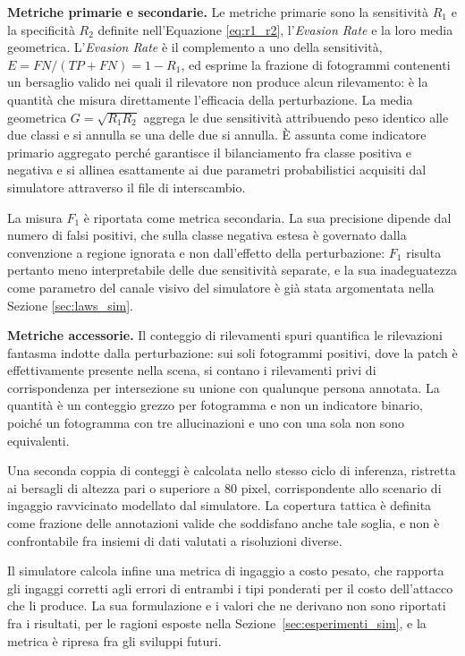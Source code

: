 \documentclass[a4paper,12pt]{report}
\begin{document}
\textbf{Metriche primarie e secondarie.}
\label{sec:metriche_scelta}
Le metriche primarie sono la sensitività $R_1$ e la specificità $R_2$ definite
nell'Equazione \ref{eq:r1_r2}, l'\textit{Evasion Rate} e la loro media
geometrica. L'\textit{Evasion Rate} è il complemento a uno della sensitività,
$E = \mathit{FN} / (\mathit{TP} + \mathit{FN}) = 1 - R_1$, ed esprime la frazione
di fotogrammi contenenti un bersaglio valido nei quali il rilevatore non produce
alcun rilevamento: è la quantità che misura direttamente l'efficacia della
perturbazione. La media geometrica $G = \sqrt{R_1 R_2}$ aggrega le due
sensitività attribuendo peso identico alle due classi e si annulla se una delle
due si annulla. È assunta come indicatore primario aggregato perché garantisce il
bilanciamento fra classe positiva e negativa e si allinea esattamente ai due
parametri probabilistici acquisiti dal simulatore attraverso il file di
interscambio.

La misura $F_1$ è riportata come metrica secondaria. La sua precisione dipende
dal numero di falsi positivi, che sulla classe negativa estesa è governato dalla
convenzione a regione ignorata e non dall'effetto della perturbazione: $F_1$
risulta pertanto meno interpretabile delle due sensitività separate, e la sua
inadeguatezza come parametro del canale visivo del simulatore è già stata
argomentata nella Sezione \ref{sec:laws_sim}.

\textbf{Metriche accessorie.}
\label{sec:metriche_accessorie}
Il conteggio di rilevamenti spuri quantifica le rilevazioni fantasma indotte dalla
perturbazione: sui soli fotogrammi positivi, dove la patch è effettivamente
presente nella scena, si contano i rilevamenti privi di corrispondenza per
intersezione su unione con qualunque persona annotata. La quantità è un
conteggio grezzo per fotogramma e non un indicatore binario, poiché un
fotogramma con tre allucinazioni e uno con una sola non sono equivalenti.

Una seconda coppia di conteggi è calcolata nello stesso ciclo di inferenza,
ristretta ai bersagli di altezza pari o superiore a $80$ pixel, corrispondente
allo scenario di ingaggio ravvicinato modellato dal simulatore. La copertura
tattica è definita come frazione delle annotazioni valide che soddisfano anche
tale soglia, e non è confrontabile fra insiemi di dati valutati a risoluzioni
diverse.

Il simulatore calcola infine una metrica di ingaggio a costo pesato, che
rapporta gli ingaggi corretti agli errori di entrambi i tipi ponderati per il
costo dell'attacco che li produce. La sua formulazione e i valori che ne
derivano non sono riportati fra i risultati, per le ragioni esposte nella
Sezione~\ref{sec:esperimenti_sim}, e la metrica è ripresa fra gli sviluppi
futuri.
\end{document}
